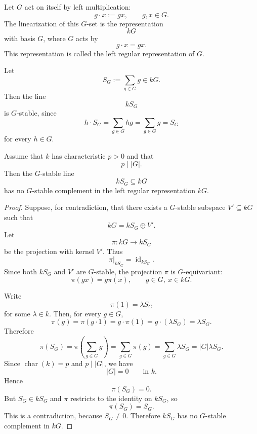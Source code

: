\begin{definition}
    Let \(G\) act on itself by left multiplication:
    \[
        g\cdot x:=gx,
        \qquad g,x\in G.
    \]
    The linearization of this \(G\)-set is the representation
    \[
        kG
    \]
    with basis \(G\), where \(G\) acts by
    \[
        g\cdot x=gx.
    \]
    This representation is called the left regular representation of \(G\).
\end{definition}

Let
\[
    S_G:=\sum_{g\in G}g\in kG.
\]
Then the line
\[
    kS_G
\]
is \(G\)-stable, since
\[
    h\cdot S_G
    =
    \sum_{g\in G} hg
    =
    \sum_{g\in G} g
    =
    S_G
\]
for every \(h\in G\).

\begin{lemma}
    Assume that \(k\) has characteristic \(p>0\) and that
    \[
        p\mid |G|.
    \]
    Then the \(G\)-stable line
    \[
        kS_G\subseteq kG
    \]
    has no \(G\)-stable complement in the left regular representation \(kG\).
\end{lemma}

\begin{proof}
    Suppose, for contradiction, that there exists a \(G\)-stable subspace \(V'\subseteq kG\)
    such that
    \[
        kG=kS_G\oplus V'.
    \]
    Let
    \[
        \pi:kG\longrightarrow kS_G
    \]
    be the projection with kernel \(V'\). Thus
    \[
        \pi|_{kS_G}=\operatorname{id}_{kS_G}.
    \]
    Since both \(kS_G\) and \(V'\) are \(G\)-stable, the projection \(\pi\) is
    \(G\)-equivariant:
    \[
        \pi(gx)=g\pi(x),
        \qquad g\in G,\ x\in kG.
    \]

    Write
    \[
        \pi(1)=\lambda S_G
    \]
    for some \(\lambda\in k\). Then, for every \(g\in G\),
    \[
        \pi(g)=\pi(g\cdot 1)=g\cdot \pi(1)=g\cdot(\lambda S_G)=\lambda S_G.
    \]
    Therefore
    \[
        \pi(S_G)
        =
        \pi\left(\sum_{g\in G}g\right)
        =
        \sum_{g\in G}\pi(g)
        =
        \sum_{g\in G}\lambda S_G
        =
        |G|\lambda S_G.
    \]
    Since \(\operatorname{char}(k)=p\) and \(p\mid |G|\), we have
    \[
        |G|=0
        \qquad\text{in } k.
    \]
    Hence
    \[
        \pi(S_G)=0.
    \]
    But \(S_G\in kS_G\) and \(\pi\) restricts to the identity on \(kS_G\), so
    \[
        \pi(S_G)=S_G.
    \]
    This is a contradiction, because \(S_G\neq 0\). Therefore \(kS_G\) has no
    \(G\)-stable complement in \(kG\).
\end{proof}


